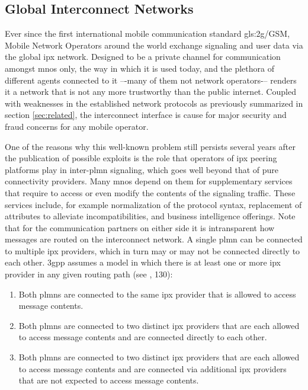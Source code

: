 \subsection{Global Interconnect Networks}

Ever since the first international mobile communication standard \gls{gls:2g}/GSM, Mobile Network Operators around the world exchange signaling and user data via the global \gls{ipx} network.
Designed to be a private channel for communication amongst \glspl{mno} only, the way in which it is used today, and the plethora of different agents connected to it –-many of them not network operators-– renders it a network that is not any more trustworthy than the public internet.
Coupled with weaknesses in the established network protocols as previously summarized in section \ref{sec:related}, the interconnect interface is cause for major security and fraud concerns for any mobile operator.

One of the reasons why this well-known problem still persists several years after the publication of possible exploits is the role that operators of \gls{ipx} peering platforms play in inter-\gls{plmn} signaling, which goes well beyond that of pure connectivity providers.
Many \glspl{mno} depend on them for supplementary services that require to access or even modify the contents of the signaling traffic.
These services include, for example normalization of the protocol syntax, replacement of attributes to alleviate incompatibilities, and business intelligence offerings.
Note that for the communication partners on either side it is intransparent how messages are routed on the interconnect network.
A single \gls{plmn} can be connected to multiple \gls{ipx} providers, which in turn may or may not be connected directly to each other.
\gls{3gpp} assumes a model in which there is at least one or more \gls{ipx} provider in any given routing path (see \cite{3gpp.33.501}, 130):

\begin{enumerate}[label=--]
    \item Both \glspl{plmn} are connected to the same \gls{ipx} provider that is allowed to access message contents.

    \item Both \glspl{plmn} are connected to two distinct \gls{ipx} providers that are each allowed to access message contents and are connected directly to each other.

    \item Both \glspl{plmn} are connected to two distinct \gls{ipx} providers that are each allowed to access message contents and are connected via additional \gls{ipx} providers that are not expected to access message contents.
\end{enumerate}

